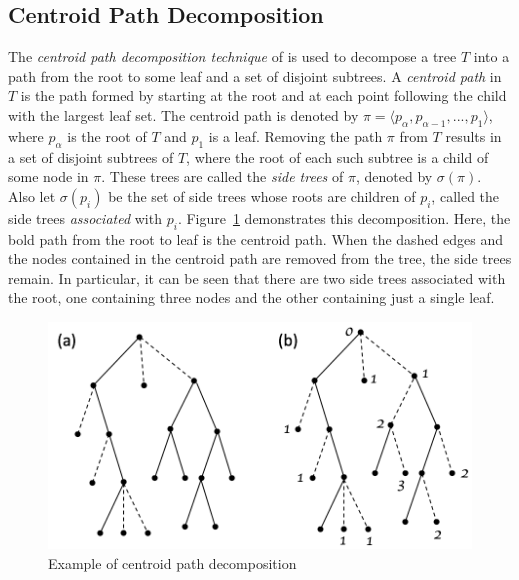 \documentclass{article}
\begin{document}
    \subsection{Centroid Path Decomposition}

    The \textit{centroid path decomposition technique} of \cite{cole2000n} is used to decompose a tree $T$ into a path from the root to some leaf and a set of disjoint subtrees. A \textit{centroid path} in $T$ is the path formed by starting at the root and at each point following the child with the largest leaf set. The centroid path is denoted by $\pi = \langle p_{\alpha}, p_{\alpha - 1}, ..., p_1 \rangle$, where $p_{\alpha}$ is the root of $T$ and $p_1$ is a leaf. Removing the path $\pi$ from $T$ results in a set of disjoint subtrees of $T$, where the root of each such subtree is a child of some node in $\pi$. These trees are called the \textit{side trees} of $\pi$, denoted by $\sigma(\pi)$. Also let $\sigma(p_i)$ be the set of side trees whose roots are children of $p_i$, called the side trees \textit{associated} with $p_i$. Figure~\ref{fig:centroid} demonstrates this decomposition. Here, the bold path from the root to leaf is the centroid path. When the dashed edges and the nodes contained in the centroid path are removed from the tree, the side trees remain. In particular, it can be seen that there are two side trees associated with the root, one containing three nodes and the other containing just a single leaf.

    \begin{figure}[h]
        \includegraphics[scale=0.5]{centroid}
        \centering
        \caption{Example of centroid path decomposition}
        \label{fig:centroid}
    \end{figure}
\end{document}
